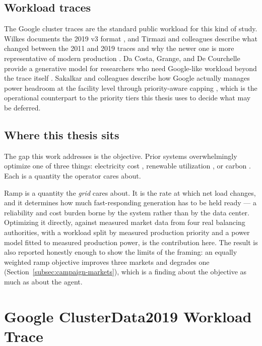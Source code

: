 ﻿\documentclass[12pt]{article}
\begin{document}
\subsection{Workload traces}
\label{subsec:related-traces}

The Google cluster traces are the standard public workload for this kind of
study. Wilkes documents the 2019 v3 format \cite{wilkes2020clusterdata2019}, and
Tirmazi and colleagues describe what changed between the 2011 and 2019 traces
and why the newer one is more representative of modern production
\cite{tirmazi2020borg}. Da Costa, Grange, and De Courchelle provide a generative
model for researchers who need Google-like workload beyond the trace itself
\cite{dacosta2016modeling}. Sakalkar and colleagues describe how Google actually
manages power headroom at the facility level through priority-aware capping
\cite{sakalkar2020oversubscription}, which is the operational counterpart to the
priority tiers this thesis uses to decide what may be deferred.

\subsection{Where this thesis sits}
\label{subsec:related-gap}

The gap this work addresses is the objective. Prior systems overwhelmingly
optimize one of three things: electricity cost
\cite{qureshi2009cutting, rao2010minimizing, haghshenas2022infrastructure},
renewable utilization
\cite{liu2011geographical, grange2018green, xu2021selfadaptive}, or carbon
\cite{radovanovic2023carbon, zhao2025cfws}. Each is a quantity the operator
cares about.

Ramp is a quantity the \emph{grid} cares about. It is the rate at which net load
changes, and it determines how much fast-responding generation has to be held
ready --- a reliability and cost burden borne by the system rather than by the
data center. Optimizing it directly, against measured market data from four
real balancing authorities, with a workload split by measured production
priority and a power model fitted to measured production power, is the
contribution here. The result is also reported honestly enough to show the
limits of the framing: an equally weighted ramp objective improves three markets
and degrades one (Section~\ref{subsec:campaign-markets}), which is a finding
about the objective as much as about the agent.

\section{Google ClusterData2019 Workload Trace}
\label{sec:clusterdata2019}
\end{document}
